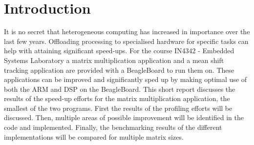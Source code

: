 \documentclass[final]{article}
\begin{document}
\section{Introduction}
It is no secret that heterogeneous computing has increased in importance over the last few years.
Offloading processing to specialised hardware for specific tasks can help with attaining significant speed-ups.
For the course IN4342 - Embedded Systems Laboratory a matrix multiplication application and a mean shift tracking application are provided with a BeagleBoard to run them on.
These applications can be improved and significantly sped up by making optimal use of both the ARM and DSP on the BeagleBoard.
This short report discusses the results of the speed-up efforts for the matrix multiplication application, the smallest of the two programs.
First the results of the profiling efforts will be discussed.
Then, multiple areas of possible improvement will be identified in the code and implemented.
Finally, the benchmarking results of the different implementations will be compared for multiple matrix sizes.
\end{document}
